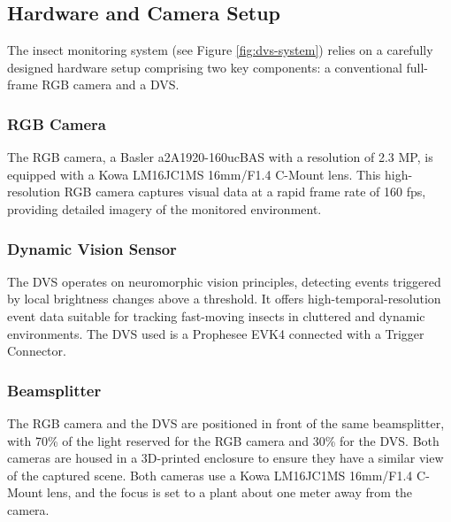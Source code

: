 \documentclass[sigchi,screen]{acmart}
\begin{document}
\subsection{Hardware and Camera Setup}
\label{ch:hardware-setup}
The insect monitoring system (see Figure \ref{fig:dvs-system}) relies on a carefully designed hardware setup comprising two key components: a conventional full-frame RGB camera and a DVS.

\subsubsection{RGB Camera}
The RGB camera, a Basler a2A1920-160ucBAS with a resolution of 2.3 MP, is equipped with a Kowa LM16JC1MS 16mm/F1.4 C-Mount lens. This high-resolution RGB camera captures visual data at a rapid frame rate of 160 fps, providing detailed imagery of the monitored environment.

\subsubsection{Dynamic Vision Sensor}
The DVS operates on neuromorphic vision principles, detecting events triggered by local brightness changes above a threshold. It offers high-temporal-resolution event data suitable for tracking fast-moving insects in cluttered and dynamic environments. The DVS used is a Prophesee EVK4 connected with a Trigger Connector.

\subsubsection{Beamsplitter}
The RGB camera and the DVS are positioned in front of the same beamsplitter, with 70\% of the light reserved for the RGB camera and 30\% for the DVS. Both cameras are housed in a 3D-printed enclosure to ensure they have a similar view of the captured scene. Both cameras use a Kowa LM16JC1MS 16mm/F1.4 C-Mount lens, and the focus is set to a plant about one meter away from the camera.

\end{document}

